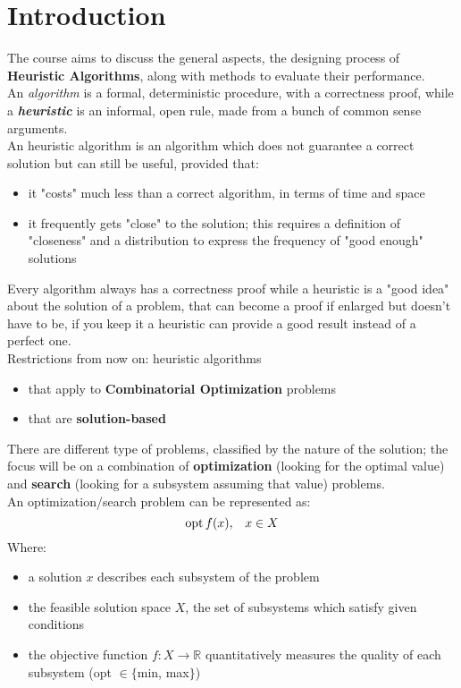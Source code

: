 	\section*{Introduction}

The course aims to discuss the general aspects, the designing process of \textbf{Heuristic Algorithms}, along with methods to evaluate their performance.\\

An \textit{algorithm} is a formal, deterministic procedure, with a correctness proof, while a \textbf{\textit{heuristic}} is an informal, open rule, made from a bunch of common sense arguments.\\
An heuristic algorithm is an algorithm which does not guarantee a correct solution but can still be useful, provided that: 
\begin{itemize}
	\item it "costs" much less than a correct algorithm, in terms of time and space
	\item it frequently gets "close" to the solution; this requires a definition of "closeness" and a distribution to express the frequency of "good enough" solutions
\end{itemize}
Every algorithm always has a correctness proof while a heuristic is a "good idea" about the solution of a problem, that can become a proof if enlarged but doesn't have to be, if you keep it a heuristic can provide a good result instead of a perfect one.\\

Restrictions from now on: heuristic algorithms 
\begin{itemize}
	\item that apply to \textbf{Combinatorial Optimization} problems
	\item that are \textbf{solution-based}
\end{itemize}
There are different type of problems, classified by the nature of the solution; the focus will be on a combination of \textbf{optimization} (looking for the optimal value) and \textbf{search} (looking for a subsystem assuming that value) problems.\\
An optimization/search problem can be represented as: 
$$ \operatorname*{opt} f(x), \;\;\; x \in X $$
Where: 
\begin{itemize}
	\item a solution $x$ describes each subsystem of the problem
	\item the feasible solution space $X$, the set of subsystems which satisfy given conditions
	\item the objective function $f: X \rightarrow \mathbb{R}$ quantitatively measures the quality of each subsystem (opt $\in \{$min, max$\}$)
\end{itemize}

